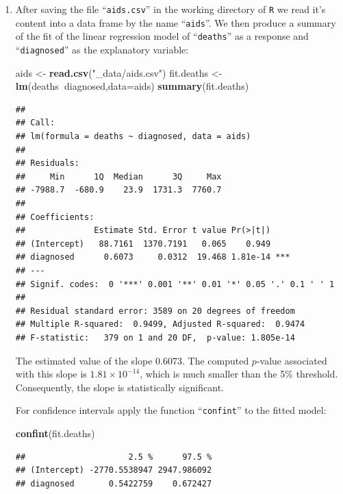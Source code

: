 \documentclass[
]{krantz}
\makeatletter
\newenvironment{Shaded}{\begin{snugshade}}{\end{snugshade}}
\newcommand{\DataTypeTok}[1]{\textcolor[rgb]{0.13,0.29,0.53}{#1}}
\newcommand{\KeywordTok}[1]{\textcolor[rgb]{0.13,0.29,0.53}{\textbf{#1}}}
\newcommand{\NormalTok}[1]{#1}
\newcommand{\OperatorTok}[1]{\textcolor[rgb]{0.81,0.36,0.00}{\textbf{#1}}}
\newcommand{\StringTok}[1]{\textcolor[rgb]{0.31,0.60,0.02}{#1}}
\newenvironment{kframe}{%
\medskip{}
\setlength{\fboxsep}{.8em}
 \def\at@end@of@kframe{}%
 \ifinner\ifhmode%
  \def\at@end@of@kframe{\end{minipage}}%
  \begin{minipage}{\columnwidth}%
 \fi\fi%
 \def\FrameCommand##1{\hskip\@totalleftmargin \hskip-\fboxsep
 \colorbox{shadecolor}{##1}\hskip-\fboxsep
     \hskip-\linewidth \hskip-\@totalleftmargin \hskip\columnwidth}%
 \MakeFramed {\advance\hsize-\width
   \@totalleftmargin\z@ \linewidth\hsize
   \@setminipage}}%
 {\par\unskip\endMakeFramed%
 \at@end@of@kframe}
\renewenvironment{Shaded}{\begin{kframe}}{\end{kframe}}
\theoremstyle{definition}
\theoremstyle{definition}
\theoremstyle{definition}
\theoremstyle{remark}
\makeatother
\begin{document}
\begin{enumerate}
\def\labelenumi{\arabic{enumi}.}
\setcounter{enumi}{1}
\item
  After saving the file ``\texttt{aids.csv}''
  in the working directory of \texttt{R} we read it's content into a data frame
  by the name ``\texttt{aids}''. We then produce a summary of the fit of the linear
  regression model of ``\texttt{deaths}'' as a response and ``\texttt{diagnosed}'' as the
  explanatory variable:

\begin{Shaded}
\begin{Highlighting}[]
\NormalTok{aids <-}\StringTok{ }\KeywordTok{read.csv}\NormalTok{(}\StringTok{"_data/aids.csv"}\NormalTok{)}
\NormalTok{fit.deaths <-}\StringTok{ }\KeywordTok{lm}\NormalTok{(deaths}\OperatorTok{~}\NormalTok{diagnosed,}\DataTypeTok{data=}\NormalTok{aids)}
\KeywordTok{summary}\NormalTok{(fit.deaths)}
\end{Highlighting}
\end{Shaded}

\begin{verbatim}
## 
## Call:
## lm(formula = deaths ~ diagnosed, data = aids)
## 
## Residuals:
##     Min      1Q  Median      3Q     Max 
## -7988.7  -680.9    23.9  1731.3  7760.7 
## 
## Coefficients:
##              Estimate Std. Error t value Pr(>|t|)    
## (Intercept)   88.7161  1370.7191   0.065    0.949    
## diagnosed      0.6073     0.0312  19.468 1.81e-14 ***
## ---
## Signif. codes:  0 '***' 0.001 '**' 0.01 '*' 0.05 '.' 0.1 ' ' 1
## 
## Residual standard error: 3589 on 20 degrees of freedom
## Multiple R-squared:  0.9499, Adjusted R-squared:  0.9474 
## F-statistic:   379 on 1 and 20 DF,  p-value: 1.805e-14
\end{verbatim}

  The estimated value of the slope 0.6073. The computed \(p\)-value
  associated with this slope is \(1.81 \times 10^{-14}\), which is much
  smaller than the 5\% threshold. Consequently, the slope is statistically
  significant.

  For confidence intervals apply the function ``\texttt{confint}'' to the fitted
  model:

\begin{Shaded}
\begin{Highlighting}[]
\KeywordTok{confint}\NormalTok{(fit.deaths)}
\end{Highlighting}
\end{Shaded}

\begin{verbatim}
##                     2.5 %      97.5 %
## (Intercept) -2770.5538947 2947.986092
## diagnosed       0.5422759    0.672427
\end{verbatim}


\end{enumerate}
\end{document}
